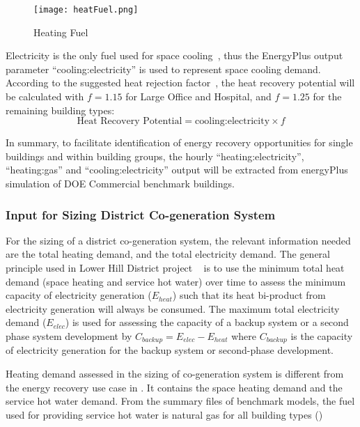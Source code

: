 \begin{figure}[h!]
  \centering
  \texttt{[image: heatFuel.png]}
  \caption[Heating Fuel]{Heating Fuel}
  \label{fig:heatFuel}
\end{figure}
Electricity is the only fuel used for space cooling~\cite{DOE2015},
thus the EnergyPlus output parameter ``cooling:electricity'' is used
to represent space cooling demand. According to the suggested heat
rejection factor~\cite{Bhatia2015}, the heat recovery potential will
be calculated with $f = 1.15$ for Large Office and Hospital, and
$f = 1.25$ for the remaining building types:
\begin{equation}\label{eq:recover}
\text{Heat Recovery Potential} = \text{cooling:electricity} \times f
\end{equation}

In summary, to facilitate identification of energy recovery
opportunities for single buildings and within building groups, the
hourly ``heating:electricity'', ``heating:gas'' and
``cooling:electricity'' output will be extracted from energyPlus
simulation of DOE Commercial benchmark buildings.

\subsubsection{Input for Sizing District Co-generation
  System}
For the sizing of a district co-generation system, the relevant
information needed are the total heating demand, and the total
electricity demand. The general principle used in Lower Hill District
project ~\cite{baird2014} is to use the minimum total heat demand
(space heating and service hot water) over time to assess the minimum
capacity of electricity generation ($E_{heat}$) such that its heat
bi-product from electricity generation will always be consumed. The
maximum total electricity demand ($E_{elec}$) is used for assessing
the capacity of a backup system or a second phase system development
by $C_{backup} = E_{elec} - E_{heat}$ where $C_{backup}$ is the
capacity of electricity generation for the backup system or
second-phase development.

Heating demand assessed in the sizing of co-generation system is
different from the energy recovery use case in 
. It contains the space heating demand and the service hot water
demand. From the summary files of benchmark models, the fuel used for
providing service hot water is natural gas for all building types
()

